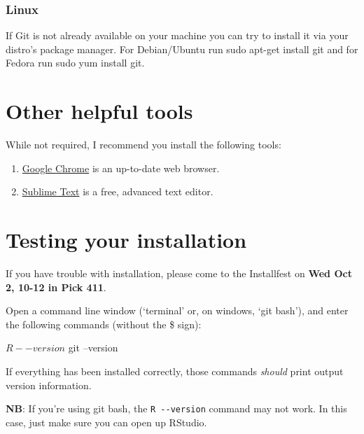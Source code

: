 \documentclass[]{book}
\newenvironment{Shaded}{\begin{snugshade}}{\end{snugshade}}
\newcommand{\ExtensionTok}[1]{#1}
\newcommand{\FunctionTok}[1]{\textcolor[rgb]{0.00,0.00,0.00}{#1}}
\newcommand{\NormalTok}[1]{#1}
\begin{document}
\hypertarget{linux-1}{%
\subsubsection*{Linux}\label{linux-1}}

If Git is not already available on your machine you can try to install it via your distro's package manager. For Debian/Ubuntu run sudo apt-get install git and for Fedora run sudo yum install git.

\hypertarget{other-helpful-tools}{%
\section{Other helpful tools}\label{other-helpful-tools}}

While not required, I recommend you install the following tools:

\begin{enumerate}
\def\labelenumi{\arabic{enumi}.}
\item
  \href{https://www.google.com/chrome/}{Google Chrome} is an up-to-date web browser.
\item
  \href{https://www.sublimetext.com/3}{Sublime Text} is a free, advanced text editor.
\end{enumerate}

\hypertarget{testing-your-installation}{%
\section{Testing your installation}\label{testing-your-installation}}

If you have trouble with installation, please come to the Installfest on \textbf{Wed Oct 2, 10-12 in Pick 411}.

Open a command line window (`terminal' or, on windows, `git bash'), and enter the following commands (without the \$ sign):

\begin{Shaded}
\begin{Highlighting}[]
\NormalTok{$ }\ExtensionTok{R}\NormalTok{ --version}
\NormalTok{$ }\FunctionTok{git}\NormalTok{ --version}
\end{Highlighting}
\end{Shaded}

If everything has been installed correctly, those commands \emph{should} print output version information.

\textbf{NB}: If you're using git bash, the \texttt{R\ -\/-version} command may not work. In this case, just make sure you can open up RStudio.
\end{document}

